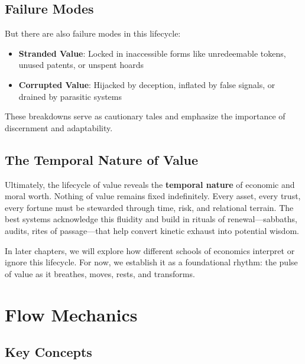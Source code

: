 \documentclass[11pt,oneside]{book}
\begin{document}
\section{Failure Modes}

But there are also failure modes in this lifecycle:

\begin{itemize}
\item \textbf{Stranded Value}: Locked in inaccessible forms like unredeemable tokens, unused patents, or unspent hoards
\item \textbf{Corrupted Value}: Hijacked by deception, inflated by false signals, or drained by parasitic systems
\end{itemize}

These breakdowns serve as cautionary tales and emphasize the importance of discernment and adaptability.

\section{The Temporal Nature of Value}

Ultimately, the lifecycle of value reveals the \textbf{temporal nature} of economic and moral worth. Nothing of value remains fixed indefinitely. Every asset, every trust, every fortune must be stewarded through time, risk, and relational terrain. The best systems acknowledge this fluidity and build in rituals of renewal—sabbaths, audits, rites of passage—that help convert kinetic exhaust into potential wisdom.

In later chapters, we will explore how different schools of economics interpret or ignore this lifecycle. For now, we establish it as a foundational rhythm: the pulse of value as it breathes, moves, rests, and transforms.


\chapter{ Flow Mechanics}

\section{Key Concepts}
\end{document}
